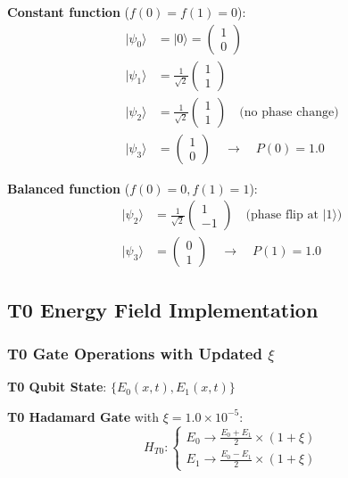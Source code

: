 \documentclass[12pt,a4paper]{article}
\newcommand{\Efield}{E}
\begin{document}
	\textbf{Constant function} ($f(0) = f(1) = 0$):
	\begin{align}
		|\psi_0\rangle &= |0\rangle = \begin{pmatrix} 1 \\ 0 \end{pmatrix} \\
		|\psi_1\rangle &= \frac{1}{\sqrt{2}}\begin{pmatrix} 1 \\ 1 \end{pmatrix} \\
		|\psi_2\rangle &= \frac{1}{\sqrt{2}}\begin{pmatrix} 1 \\ 1 \end{pmatrix} \quad \text{(no phase change)} \\
		|\psi_3\rangle &= \begin{pmatrix} 1 \\ 0 \end{pmatrix} \quad \rightarrow \quad P(0) = 1.0
	\end{align}
	
	\textbf{Balanced function} ($f(0) = 0, f(1) = 1$):
	\begin{align}
		|\psi_2\rangle &= \frac{1}{\sqrt{2}}\begin{pmatrix} 1 \\ -1 \end{pmatrix} \quad \text{(phase flip at } |1\rangle\text{)} \\
		|\psi_3\rangle &= \begin{pmatrix} 0 \\ 1 \end{pmatrix} \quad \rightarrow \quad P(1) = 1.0
	\end{align}
	
	\subsection{T0 Energy Field Implementation}
	
	\subsubsection{T0 Gate Operations with Updated $\xi$}
	
	\textbf{T0 Qubit State}: $\{\Efield_0(x,t), \Efield_1(x,t)\}$
	
	\textbf{T0 Hadamard Gate} with $\xi = 1.0 \times 10^{-5}$:
	\begin{equation}
		H_{T0}: \begin{cases}
			\Efield_0 \rightarrow \frac{\Efield_0 + \Efield_1}{2} \times (1 + \xi) \\
			\Efield_1 \rightarrow \frac{\Efield_0 - \Efield_1}{2} \times (1 + \xi)
		\end{cases}
	\end{equation}
	
\end{document}
